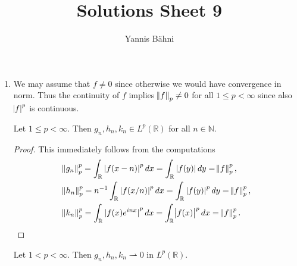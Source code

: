 

\title{Solutions Sheet 9}
\author{Yannis B\"{a}hni}
\address[Yannis B\"{a}hni]{University of Zurich, R\"{a}mistrasse 71, 8006 Zurich}



\maketitle
\thispagestyle{fancy}

\setcounter{section}{1}

\begin{enumerate}[label = \textbf{Exercise \arabic*.},wide = 0pt, itemsep = 1.5ex]
	\item We may assume that $f \neq 0$ since otherwise we would have convergence in norm. Thus the continuity of $f$ implies $\norm{f}_p \neq 0$ for all $1 \leq p < \infty$ since also $\abs{f}^p$ is continuous.
		\begin{lemma}
			Let $1 \leq p < \infty$. Then $g_n,h_n,k_n \in L^p(\mathbb{R})$ for all $n \in \mathbb{N}$.	
		\end{lemma}

		\begin{proof}
			This immediately follows from the computations
			\begin{align*}
				&\norm{g_n}_p^p = \int_\mathbb{R} \abs[0]{f(x - n)}^p dx = \int_\mathbb{R} \abs[0]{f(y)} dy = \norm{f}_p^p,\\
				&\norm{h_n}_p^p = n^{-1}\int_\mathbb{R} \abs[0]{f(x/n)}^p dx = \int_\mathbb{R} \abs[0]{f(y)}^p dy = \norm{f}_p^p,\\
				&\norm{k_n}_p^p = \int_\mathbb{R} \abs[0]{f(x) e^{inx}}^p dx = \int_\mathbb{R} \abs{f(x)}^p dx = \norm{f}_p^p .
			\end{align*}	
		\end{proof}

		\begin{lemma}
			Let $1 < p < \infty$. Then $g_n,h_n,k_n \rightharpoonup 0$ in $L^p(\mathbb{R})$.
		\end{lemma}


\end{enumerate}
